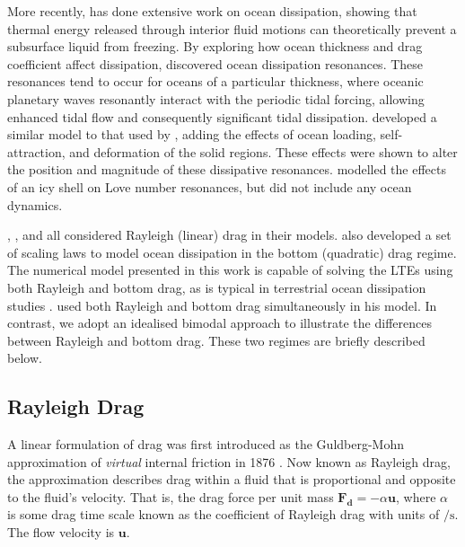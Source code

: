 More recently, \citet{tyler2008strong,tyler2009ocean,tyler2011tidal,tyler2014comparative} has done extensive work on ocean dissipation, showing that thermal energy released through interior fluid motions can theoretically prevent a subsurface liquid from freezing. By exploring how ocean thickness and drag coefficient affect dissipation, \citet{tyler2011tidal} discovered ocean dissipation resonances. These resonances tend to occur for oceans of a particular thickness, where oceanic planetary waves resonantly interact with the periodic tidal forcing, allowing enhanced tidal flow and consequently significant tidal dissipation. \citet{matsuyama2014tidal} developed a similar model to that used by \citet{tyler2011tidal}, adding the effects of ocean loading, self-attraction, and deformation of the solid regions. These effects were shown to alter the position and magnitude of these dissipative resonances. \citet{kamata2015tidal} modelled the effects of an icy shell on Love number resonances, but did not include any ocean dynamics.

\citet{tyler2011tidal}, \citet{matsuyama2014tidal}, and \citet{chen2013tidal} all considered Rayleigh (linear) drag in their models.  \citet{chen2013tidal} also developed a set of scaling laws to model ocean dissipation in the bottom (quadratic) drag regime. The numerical model presented in this work is capable of solving the LTEs using both Rayleigh and bottom drag, as is typical in terrestrial ocean dissipation studies \citep{taylor1920tidal,jeffreys1921tidal,zahel1977global,egbert2001estimates,jayne2001parameterizing}. \citet{sears1995tidal} used both Rayleigh and bottom drag simultaneously in his model. In contrast, we adopt an idealised bimodal approach to illustrate the differences between Rayleigh and bottom drag. These two regimes are briefly described below.

\subsection{Rayleigh Drag}

A linear formulation of drag was first introduced as the Guldberg-Mohn approximation of \textit{virtual} internal friction in 1876 \citep{neumann1968ocean}. Now known as Rayleigh drag, the approximation describes drag within a fluid that is proportional and opposite to the fluid's velocity. That is, the drag force per unit mass $\bm{F_d} = -\alpha \bm{u}$, where $\alpha$ is some drag time scale known as the coefficient of Rayleigh drag with units of $\si{\per\second}$. The flow velocity is $\bm{u}$. 

